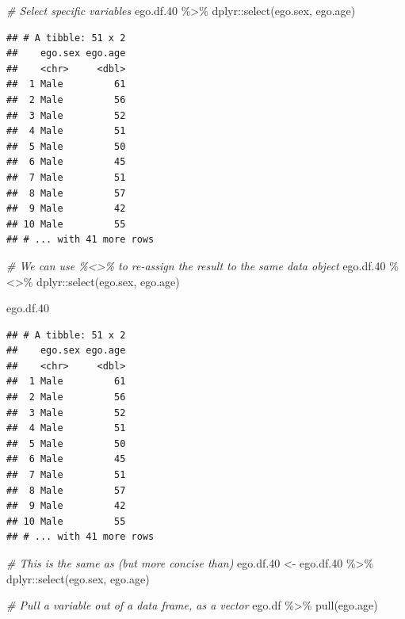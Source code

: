 \documentclass[
]{book}
\newenvironment{Shaded}{\begin{snugshade}}{\end{snugshade}}
\newcommand{\CommentTok}[1]{\textcolor[rgb]{0.56,0.35,0.01}{\textit{#1}}}
\newcommand{\FloatTok}[1]{\textcolor[rgb]{0.00,0.00,0.81}{#1}}
\newcommand{\FunctionTok}[1]{\textcolor[rgb]{0.00,0.00,0.00}{#1}}
\newcommand{\NormalTok}[1]{#1}
\newcommand{\OtherTok}[1]{\textcolor[rgb]{0.56,0.35,0.01}{#1}}
\newcommand{\SpecialCharTok}[1]{\textcolor[rgb]{0.00,0.00,0.00}{#1}}
\begin{document}
\begin{Shaded}
\begin{Highlighting}[]
\CommentTok{\# Select specific variables}
\NormalTok{ego.df}\FloatTok{.40} \SpecialCharTok{\%\textgreater{}\%}
\NormalTok{  dplyr}\SpecialCharTok{::}\FunctionTok{select}\NormalTok{(ego.sex, ego.age)}
\end{Highlighting}
\end{Shaded}

\begin{verbatim}
## # A tibble: 51 x 2
##    ego.sex ego.age
##    <chr>     <dbl>
##  1 Male         61
##  2 Male         56
##  3 Male         52
##  4 Male         51
##  5 Male         50
##  6 Male         45
##  7 Male         51
##  8 Male         57
##  9 Male         42
## 10 Male         55
## # ... with 41 more rows
\end{verbatim}

\begin{Shaded}
\begin{Highlighting}[]
\CommentTok{\# We can use \%\textless{}\textgreater{}\% to re{-}assign the result to the same data object}
\NormalTok{ego.df}\FloatTok{.40} \SpecialCharTok{\%\textless{}\textgreater{}\%}
\NormalTok{  dplyr}\SpecialCharTok{::}\FunctionTok{select}\NormalTok{(ego.sex, ego.age)}

\NormalTok{ego.df}\FloatTok{.40}
\end{Highlighting}
\end{Shaded}

\begin{verbatim}
## # A tibble: 51 x 2
##    ego.sex ego.age
##    <chr>     <dbl>
##  1 Male         61
##  2 Male         56
##  3 Male         52
##  4 Male         51
##  5 Male         50
##  6 Male         45
##  7 Male         51
##  8 Male         57
##  9 Male         42
## 10 Male         55
## # ... with 41 more rows
\end{verbatim}

\begin{Shaded}
\begin{Highlighting}[]
\CommentTok{\# This is the same as (but more concise than)}
\NormalTok{ego.df}\FloatTok{.40} \OtherTok{\textless{}{-}}\NormalTok{ ego.df}\FloatTok{.40} \SpecialCharTok{\%\textgreater{}\%}
\NormalTok{  dplyr}\SpecialCharTok{::}\FunctionTok{select}\NormalTok{(ego.sex, ego.age)}

\CommentTok{\# Pull a variable out of a data frame, as a vector}
\NormalTok{ego.df }\SpecialCharTok{\%\textgreater{}\%}
  \FunctionTok{pull}\NormalTok{(ego.age)}
\end{Highlighting}
\end{Shaded}
\end{document}
